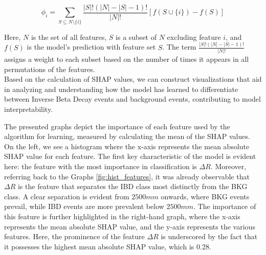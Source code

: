 \begin{equation}
	\phi_i = \sum_{S \subseteq N \setminus \{i\}} \frac{|S|!(|N| - |S| - 1)!}{|N|!} [f(S \cup \{i\}) - f(S)]
\end{equation}

Here, \(N\) is the set of all features, \(S\) is a subset of \(N\) excluding feature \(i\), and \(f(S)\) is the model's prediction with feature set \(S\). The term \(\frac{|S|!(|N| - |S| - 1)!}{|N|!}\) assigns a weight to each subset based on the number of times it appears in all permutations of the features.\\



Based on the calculation of SHAP values, we can construct visualizations that aid in analyzing and understanding how the model has learned to differentiate between Inverse Beta Decay events and background events, contributing to model interpretability. 

\begin{figure}[h!]
	\centering
	
	
\end{figure}


The presented graphs depict the importance of each feature used by the algorithm for learning, measured by calculating the mean of the SHAP values. On the left, we see a histogram where the x-axis represents the mean absolute SHAP value for each feature. The first key characteristic of the model is evident here: the feature with the most importance in classification is $\Delta R$. Moreover, referring back to the Graphs \ref{fig:hist_features}, it was already observable that $\Delta R$ is the feature that separates the IBD class most distinctly from the BKG class. A clear separation is evident from $2500 mm$ onwards, where BKG events prevail, while IBD events are more prevalent below $2500 mm$. The importance of this feature is further highlighted in the right-hand graph, where the x-axis represents the mean absolute SHAP value, and the y-axis represents the various features. Here, the prominence of the feature $\Delta R$ is underscored by the fact that it possesses the highest mean absolute SHAP value, which is 0.28.  \\

